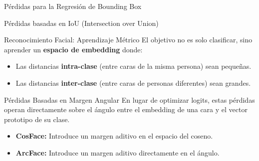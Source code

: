 \documentclass[aspectratio=169, 10pt]{beamer}
\begin{document}
\begin{frame}[shrink]{Pérdidas para la Regresión de Bounding Box}
\begin{block}{Pérdidas basadas en IoU (Intersection over Union)}


    \end{block}
\end{frame}

\begin{frame}{Reconocimiento Facial: Aprendizaje Métrico}
    El objetivo no es solo clasificar, sino aprender un \textbf{espacio de embedding} donde:
    \begin{itemize}
        \item Las distancias \textbf{intra-clase} (entre caras de la misma persona) sean pequeñas.
        \item Las distancias \textbf{inter-clase} (entre caras de personas diferentes) sean grandes.
    \end{itemize}
    
    \begin{block}{Pérdidas Basadas en Margen Angular}
        En lugar de optimizar logits, estas pérdidas operan directamente sobre el ángulo entre el embedding de una cara y el vector prototipo de su clase.
        \begin{itemize}
            \item \textbf{CosFace:} Introduce un margen aditivo en el espacio del coseno.
            \item \textbf{ArcFace:} Introduce un margen aditivo directamente en el ángulo.
        \end{itemize}
    \end{block}
\end{frame}
\end{document}

